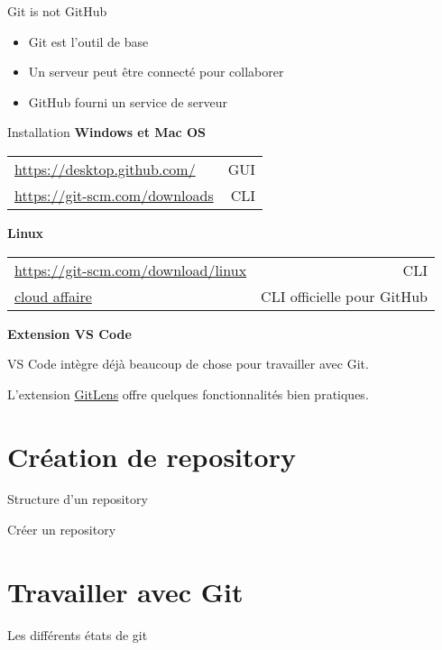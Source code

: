 \documentclass{beamer}
\begin{document}
\begin{frame}{Git is not GitHub}
\begin{itemize}
	\item Git est l'outil de base
	\item Un serveur peut être connecté pour collaborer
	\item GitHub fourni un service de serveur
\end{itemize}
\end{frame}

\begin{frame}{Installation}
	\textbf{Windows et Mac OS}

	\begin{tabularx}{\textwidth}{Xr}
	\url{https://desktop.github.com/}	& GUI 	\\
	\url{https://git-scm.com/downloads}	& CLI
	\end{tabularx}

	\bigskip

	\textbf{Linux}

	\begin{tabularx}{\textwidth}{Xr}
		\url{https://git-scm.com/download/linux}	& CLI 	\\
		\href{https://cloudaffaire.com/how-to-install-and-configure-github-cli-gh/}{cloud affaire}		& CLI officielle pour GitHub
	\end{tabularx}

	\bigskip

	\textbf{Extension VS Code}

	VS Code intègre déjà beaucoup de chose pour travailler avec Git.

	L'extension \href{https://marketplace.visualstudio.com/items?itemName=eamodio.gitlens}{GitLens} offre quelques fonctionnalités bien pratiques.
\end{frame}

\section{Création de repository}
\begin{frame}{Structure d'un repository}
	
\end{frame}

\begin{frame}{Créer un repository}
	
\end{frame}

\section{Travailler avec Git}
\begin{frame}{Les différents états de git}
\end{frame}
\end{document}
